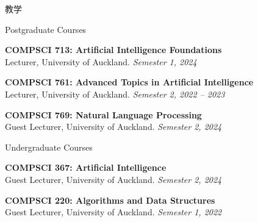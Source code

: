 \documentclass{resume} %
\begin{document}
\begin{rSection}{教学}
	\begin{rSubsection}{Postgraduate Courses}{}{}{}
	\item {\bf COMPSCI 713: Artificial Intelligence Foundations}\\ Lecturer, University of Auckland. \hfill {\em Semester 1, 2024}
	\item {\bf COMPSCI 761: Advanced Topics in Artificial Intelligence}\\ Lecturer, University of Auckland. \hfill {\em Semester 2, 2022 -- 2023}
	\item {\bf COMPSCI 769: Natural Language Processing}\\ Guest Lecturer, University of Auckland. \hfill {\em Semester 2, 2024} 
	\end{rSubsection}
	\begin{rSubsection}{Undergraduate Courses}{}{}{}
		\item {\bf COMPSCI 367: Artificial Intelligence}\\ Guest Lecturer, University of Auckland. \hfill {\em Semester 2, 2024}
		\item {\bf COMPSCI 220: Algorithms and Data Structures}\\ Guest Lecturer, University of Auckland. \hfill {\em Semester 1, 2022}
	\end{rSubsection}
\end{rSection}
\end{document}
